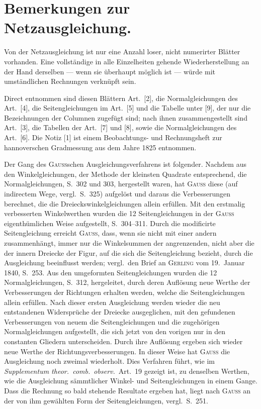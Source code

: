 \documentclass[12pt,a4paper]{article}
\theoremstyle{plain}
\theoremstyle{definition}
\theoremstyle{remark}
\begin{document}
\newpage
\section*{Bemerkungen zur Netzausgleichung.}
\label{sec:bemerkungen-netz}

Von der Netzausgleichung ist nur eine Anzahl loser, nicht numerirter Bl\"atter vorhanden. Eine vollst\"andige in alle Einzelheiten gehende Wiederherstellung an der Hand derselben --- wenn sie \"uberhaupt m\"oglich ist --- w\"urde mit umst\"andlichen Rechnungen verkn\"upft sein.

Direct entnommen sind diesen Bl\"attern Art.\ [2], die Normalgleichungen des Art.\ [4], die Seitengleichungen im Art.\ [5] und die Tabelle unter [9], der nur die Bezeichnungen der Columnen zugef\"ugt sind; nach ihnen zusammengestellt sind Art.\ [3], die Tabellen der Art.\ [7] und [8], sowie die Normalgleichungen des Art.\ [6]. Die Notiz [1] ist einem Beobachtungs- und Rechnungsheft zur hannoverschen Gradmessung aus dem Jahre 1825 entnommen.

Der Gang des \textsc{Gauss}schen Ausgleichungsverfahrens ist folgender. Nachdem aus den Winkelgleichungen, der Methode der kleinsten Quadrate entsprechend, die Normalgleichungen, S.\ 302 und 303, hergestellt waren, hat \textsc{Gauss} diese (auf indirectem Wege, vergl.\ S.\ 325) aufgel\"ost und daraus die Verbesserungen berechnet, die die Dreieckswinkelgleichungen allein erf\"ullen. Mit den erstmalig verbesserten Winkelwerthen wurden die 12 Seitengleichungen in der \textsc{Gauss} eigenth\"umlichen Weise aufgestellt, S.\ 304--311. Durch die modificirte Seitengleichung erreicht \textsc{Gauss}, dass, wenn sie nicht mit einer andern zusammenh\"angt, immer nur die Winkelsummen der angrenzenden, nicht aber die der innern Dreiecke der Figur, auf die sich die Seitengleichung bezieht, durch die Ausgleichung beeinflusst werden; vergl.\ den Brief an \textsc{Gerling} vom 19.\ Januar 1840, S.\ 253. Aus den umgeformten Seitengleichungen wurden die 12 Normalgleichungen, S.\ 312, hergeleitet, durch deren Aufl\"osung neue Werthe der Verbesserungen der Richtungen erhalten werden, welche die Seitengleichungen allein erf\"ullen. Nach dieser ersten Ausgleichung werden wieder die neu entstandenen Widerspr\"uche der Dreiecke ausgeglichen, mit den gefundenen Verbesserungen von neuem die Seitengleichungen und die zugeh\"origen Normalgleichungen aufgestellt, die sich jetzt von den vorigen nur in den constanten Gliedern unterscheiden. Durch ihre Aufl\"osung ergeben sich wieder neue Werthe der Richtungsverbesserungen. In dieser Weise hat \textsc{Gauss} die Ausgleichung noch zweimal wiederholt. Dies Verfahren f\"uhrt, wie im \textit{Supplementum theor.\ comb.\ observ.}\ Art.\ 19 gezeigt ist, zu denselben Werthen, wie die Ausgleichung s\"ammtlicher Winkel- und Seitengleichungen in einem Gange. Dass die Rechnung so bald stehende Resultate ergeben hat, liegt nach \textsc{Gauss} an der von ihm gew\"ahlten Form der Seitengleichungen, vergl.\ S.\ 251.
\end{document}
